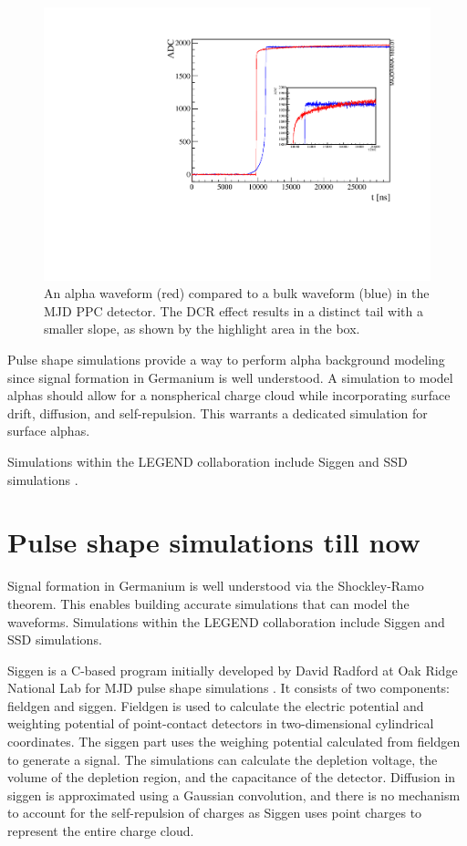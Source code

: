 \begin{figure}
\centering
  \includegraphics[width=0.5\linewidth]{ch3/figs/dcr_waveform.pdf}
 \caption{An alpha waveform (red) compared to a bulk waveform (blue) in the MJD PPC detector. The DCR effect results in a distinct tail with a smaller slope, as shown by the highlight area in the box.}
\label{fig:dcr_waveform}
  \end{figure}

Pulse shape simulations provide a way to perform alpha background modeling since signal formation in Germanium is well understood. A simulation to model alphas should allow for a nonspherical charge cloud while incorporating surface drift, diffusion, and self-repulsion. This warrants a dedicated simulation for surface alphas.


Simulations within the LEGEND collaboration include Siggen \cite{siggen_paper} and SSD simulations \cite{Abt:2021SSD}.

\section{Pulse shape simulations till now}

Signal formation in Germanium is well understood via the Shockley-Ramo theorem. This enables building accurate simulations that can model the waveforms. Simulations within the LEGEND collaboration include Siggen and SSD simulations. 

Siggen is a C-based program initially developed by David Radford at Oak Ridge National Lab for MJD pulse shape simulations \cite{siggen_paper}. It consists of two components: fieldgen and siggen. Fieldgen is used to calculate the electric potential and weighting potential of point-contact detectors in two-dimensional cylindrical coordinates. The siggen part uses the weighing potential calculated from fieldgen to generate a signal. The simulations can calculate the depletion voltage, the volume of the depletion region, and the capacitance of the detector. Diffusion in siggen is approximated using a Gaussian convolution, and there is no mechanism to account for the self-repulsion of charges as Siggen uses point charges to represent the entire charge cloud.

